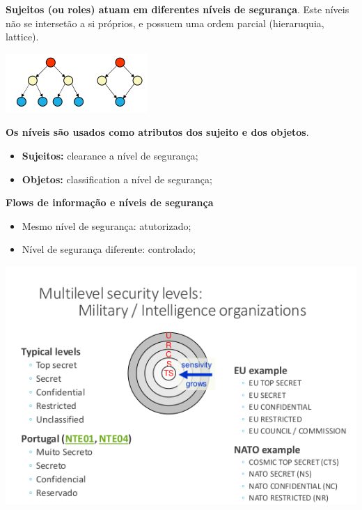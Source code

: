 \documentclass{article}
\begin{document}
\begin{flushleft}
  \textbf{Sujeitos (ou roles) atuam em diferentes níveis de segurança}. Este níveis não
  se intersetão a si próprios, e possuem uma ordem parcial (hieraruquia, lattice).
  \begin{center}
    \includegraphics[scale=0.4]{21}
  \end{center}

  \vspace{2mm}

  \textbf{Os níveis são usados como atributos dos sujeito e dos objetos}.
  \begin{itemize}
    \item \textbf{Sujeitos:} clearance a nível de segurança;
    \item \textbf{Objetos:} classification a nível de segurança;
  \end{itemize}

  \vspace{2mm}

  \textbf{Flows de informação e níveis de segurança}
  \begin{itemize}
    \item Mesmo nível de segurança: atutorizado;
    \item Nível de segurança diferente: controlado;
  \end{itemize}

  \pagebreak

  \begin{center}
    \includegraphics[scale=0.4]{22}
  \end{center}
\end{flushleft}
\end{document}
